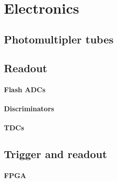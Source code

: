 \section{Electronics}

\subsection{Photomultipler tubes}
\subsection{Readout}
\paragraph{Flash ADCs}
\paragraph{Discriminators}
\paragraph{TDCs}
\subsection{Trigger and readout}
\paragraph{FPGA}



